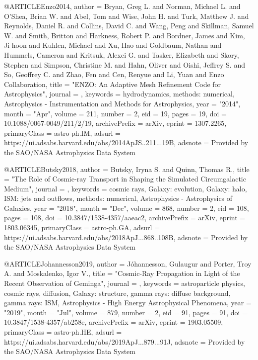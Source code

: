 \documentclass[useAMS,usenatbib]{mnras}
\begin{document}
@ARTICLE{Enzo2014,
       author = {{Bryan}, Greg L. and {Norman}, Michael L. and {O'Shea}, Brian W. and
         {Abel}, Tom and {Wise}, John H. and {Turk}, Matthew J. and
         {Reynolds}, Daniel R. and {Collins}, David C. and {Wang}, Peng and
         {Skillman}, Samuel W. and {Smith}, Britton and {Harkness}, Robert P. and
         {Bordner}, James and {Kim}, Ji-hoon and {Kuhlen}, Michael and
         {Xu}, Hao and {Goldbaum}, Nathan and {Hummels}, Cameron and
         {Kritsuk}, Alexei G. and {Tasker}, Elizabeth and {Skory}, Stephen and
         {Simpson}, Christine M. and {Hahn}, Oliver and {Oishi}, Jeffrey S. and
         {So}, Geoffrey C. and {Zhao}, Fen and {Cen}, Renyue and {Li}, Yuan and
         {Enzo Collaboration}},
        title = "{ENZO: An Adaptive Mesh Refinement Code for Astrophysics}",
      journal = {\apjs},
     keywords = {hydrodynamics, methods: numerical, Astrophysics - Instrumentation and Methods for Astrophysics},
         year = "2014",
        month = "Apr",
       volume = {211},
       number = {2},
          eid = {19},
        pages = {19},
          doi = {10.1088/0067-0049/211/2/19},
archivePrefix = {arXiv},
       eprint = {1307.2265},
 primaryClass = {astro-ph.IM},
       adsurl = {https://ui.adsabs.harvard.edu/abs/2014ApJS..211...19B},
      adsnote = {Provided by the SAO/NASA Astrophysics Data System}
}

@ARTICLE{Butsky2018,
       author = {{Butsky}, Iryna S. and {Quinn}, Thomas R.},
        title = "{The Role of Cosmic-ray Transport in Shaping the Simulated Circumgalactic Medium}",
      journal = {\apj},
     keywords = {cosmic rays, Galaxy: evolution, Galaxy: halo, ISM: jets and outflows, methods: numerical, Astrophysics - Astrophysics of Galaxies},
         year = "2018",
        month = "Dec",
       volume = {868},
       number = {2},
          eid = {108},
        pages = {108},
          doi = {10.3847/1538-4357/aaeac2},
archivePrefix = {arXiv},
       eprint = {1803.06345},
 primaryClass = {astro-ph.GA},
       adsurl = {https://ui.adsabs.harvard.edu/abs/2018ApJ...868..108B},
      adsnote = {Provided by the SAO/NASA Astrophysics Data System}
}

@ARTICLE{Johannesson2019,
       author = {{J{\'o}hannesson}, Gu{\dj}laugur and {Porter}, Troy A. and
         {Moskalenko}, Igor V.},
        title = "{Cosmic-Ray Propagation in Light of the Recent Observation of Geminga}",
      journal = {\apj},
     keywords = {astroparticle physics, cosmic rays, diffusion, Galaxy: structure, gamma rays: diffuse background, gamma rays: ISM, Astrophysics - High Energy Astrophysical Phenomena},
         year = "2019",
        month = "Jul",
       volume = {879},
       number = {2},
          eid = {91},
        pages = {91},
          doi = {10.3847/1538-4357/ab258e},
archivePrefix = {arXiv},
       eprint = {1903.05509},
 primaryClass = {astro-ph.HE},
       adsurl = {https://ui.adsabs.harvard.edu/abs/2019ApJ...879...91J},
      adsnote = {Provided by the SAO/NASA Astrophysics Data System}
}
\end{document}
